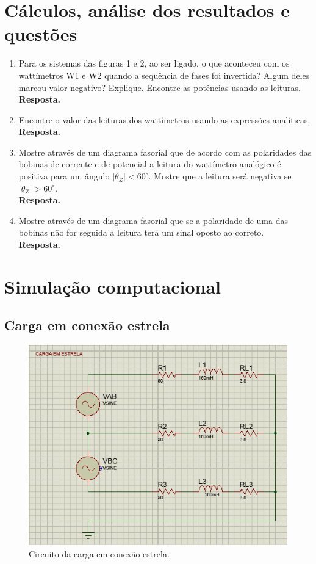 \documentclass[a4paper,12pt,oneside,openany,table,xcdraw]{article}
\begin{document}
\section{Cálculos, análise dos resultados e questões} %
\begin{enumerate}[1)]
\item Para os sistemas das figuras 1 e 2, ao ser ligado, o que aconteceu com os wattímetros W1 e W2 quando a sequência de fases foi invertida? Algum deles marcou valor negativo? Explique. Encontre as potências usando as leituras. \\
\textbf{Resposta.} 

\item  Encontre o valor das leituras dos wattímetros usando as expressões analíticas. \\
\textbf{Resposta.} 

\item  Mostre através de um diagrama fasorial que de acordo com as polaridades das bobinas de corrente e de potencial a leitura do wattímetro analógico é positiva para um ângulo $| \theta_Z| < 60^\circ$. Mostre que a leitura será negativa se $| \theta_Z| > 60^\circ$. \\
\textbf{Resposta.} 

\item  Mostre através de um diagrama fasorial que se a polaridade de uma das bobinas não for seguida a leitura terá um sinal oposto ao correto.  \\
\textbf{Resposta.} 

\end{enumerate}

\newpage
\section{Simulação computacional} %
\subsection{Carga em conexão estrela}
\begin{figure}[H]
\centering
\captionsetup{font=scriptsize}
\includegraphics[width=14cm]{sim1}
\caption{Circuito da carga em conexão estrela.}
\label{sim1}
\end{figure}
\end{document}
